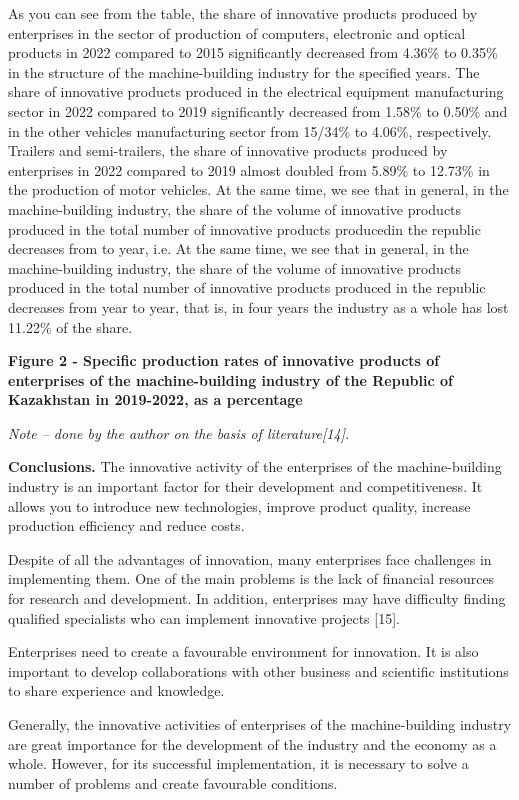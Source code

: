 As you can see from the table, the share of innovative products produced
by enterprises in the sector of production of computers, electronic and
optical products in 2022 compared to 2015 significantly decreased from
4.36\% to 0.35\% in the structure of the machine-building industry for
the specified years. The share of innovative products produced in the
electrical equipment manufacturing sector in 2022 compared to 2019
significantly decreased from 1.58\% to 0.50\% and in the other vehicles
manufacturing sector from 15/34\% to 4.06\%, respectively. Trailers and
semi-trailers, the share of innovative products produced by enterprises
in 2022 compared to 2019 almost doubled from 5.89\% to 12.73\% in the
production of motor vehicles. At the same time, we see that in general,
in the machine-building industry, the share of the volume of innovative
products produced in the total number of innovative products producedin
the republic decreases from to year, i.e. At the same time, we see that
in general, in the machine-building industry, the share of the volume of
innovative products produced in the total number of innovative products
produced in the republic decreases from year to year, that is, in four
years the industry as a whole has lost 11.22\% of the share.

{\bfseries Figure 2 - Specific production rates of innovative products of
enterprises of the machine-building industry of the Republic of
Kazakhstan in 2019-2022, as a percentage}

\emph{Note -- done by the author on the basis of literature{[}14{]}.}

{\bfseries Conclusions.} The innovative activity of the enterprises of the
machine-building industry is an important factor for their development
and competitiveness. It allows you to introduce new technologies,
improve product quality, increase production efficiency and reduce
costs.

Despite of all the advantages of innovation, many enterprises face
challenges in implementing them. One of the main problems is the lack of
financial resources for research and development. In addition,
enterprises may have difficulty finding qualified specialists who can
implement innovative projects {[}15{]}.

Enterprises need to create a favourable environment for innovation. It
is also important to develop collaborations with other business and
scientific institutions to share experience and knowledge.

Generally, the innovative activities of enterprises of the
machine-building industry are great importance for the development of
the industry and the economy as a whole. However, for its successful
implementation, it is necessary to solve a number of problems and create
favourable conditions.

